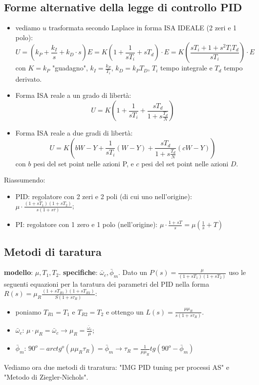 \begin{landscape}
\begin{multicols*}{2}
    \subsection{Forme alternative della legge di controllo PID}
    \begin{itemize}
        \item vediamo $u$ trasformata secondo Laplace in forma ISA IDEALE (2 zeri e 1 polo):
        \[
            U = (k_P + \frac{k_I}{s} + k_D \cdot s) E = K ( 1 + \frac{1}{sT_i} + s T_d) \cdot E = K \left( \frac{sT_i + 1 + s^2 T_i T_d}{sT_i} \right) \cdot E
        \]
        con $K = k_P$ "guadagno", $k_I = \frac{k_P}{T_i}$, $k_D = k_P T_D$, $T_i$ tempo integrale e $T_d$ tempo derivato.
        \item Forma ISA reale a un grado di libertà:
        \[
            U = K \left( 1+ \frac{1}{sT_i} + \frac{sT_d}{1+s \frac{T_d}{N}}\right)
        \]
        \item Forma ISA reale a due gradi di libertà:
        \[
            U = K \left( b W - Y + \frac{1}{sT_i}(W-Y) + \frac{sT_d}{1+s \frac{T_d}{N}} (c W-Y)\right)
        \]
        con $b$ pesi del set point nelle azioni P, e $c$ pesi del set point nelle azioni $D$. 
    \end{itemize}
    Riassumendo:
    \begin{itemize}
        \item PID: regolatore con 2 zeri e 2 poli (di cui uno nell'origine): $\mu \cdot \frac{(1+sT_1) (1+sT_2)}{s(1+s \tau)}$;
        \item PI: regolatore con 1 zero e 1 polo (nell'origine): $\mu \cdot  \frac{1+sT}{s} = \mu(\frac{1}{s}+ T)$ 
    \end{itemize} 
    \subsection{Metodi di taratura}
    \textbf{modello}: $\mu, T_1, T_2$.\newline
    \textbf{specifiche}: $\bar{\omega}_c, \bar{\phi}_m$.\newline
    \newline
    Dato un $P(s) = \frac{\mu}{(1+sT_1) (1+sT_2)}$ uso le seguenti equazioni per la taratura dei parametri del PID nella forma $R(s) = \mu_R \frac{(1+sT_{R1}) (1+sT_{R2})}{S (1+s \tau_R)}$:
    \begin{itemize}
        \item poniamo $T_{R1} = T_1$ e $T_{R2} = T_2$ e ottengo un $L(s) = \frac{\mu \mu_R}{s(1+s \tau_R)}$.
        \item $\bar{\omega}_c$: $\mu \cdot \mu_R = \bar{\omega}_c \rightarrow \mu_R = \frac{\bar{\omega}_c}{\mu}$;
        \item $\bar{\phi}_m$: $90^o - arctg^o(\mu \mu_R \tau_R) = \bar{\phi}_m \rightarrow \tau_R = \frac{1}{\mu \mu_R} tg(90^o - \bar{\phi}_m)$  
    \end{itemize}
    Vediamo ora due metodi di traratura: "IMG PID tuning per processi AS" e "Metodo di Ziegler-Nichols".

\end{multicols*}
\end{landscape}
